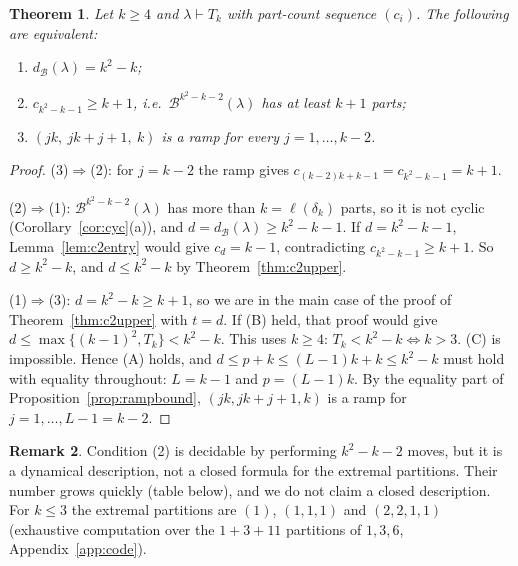 \documentclass[11pt]{article}
\newtheorem{theorem}{Theorem}[section]
\theoremstyle{definition}
\newtheorem{remark}[theorem]{Remark}
\newcommand{\B}{\mathcal{B}}
\newcommand{\dB}{d_{\mathcal{B}}}
\renewcommand{\le}{\leqslant}
\renewcommand{\ge}{\geqslant}
\begin{document}
\begin{theorem}\label{thm:c2ext}
Let $k\ge4$ and $\lambda\vdash T_k$ with part-count sequence $(c_i)$.  The following are equivalent:
\begin{enumerate}
\item[(1)] $\dB(\lambda)=k^2-k$;
\item[(2)] $c_{k^2-k-1}\ge k+1$, i.e.\ $\B^{k^2-k-2}(\lambda)$ has at least $k+1$ parts;
\item[(3)] $(jk,\ jk+j+1,\ k)$ is a ramp for every $j=1,\dots,k-2$.
\end{enumerate}
\end{theorem}
\begin{proof}
(3)$\Rightarrow$(2): for $j=k-2$ the ramp gives $c_{(k-2)k+k-1}=c_{k^2-k-1}=k+1$.

(2)$\Rightarrow$(1): $\B^{k^2-k-2}(\lambda)$ has more than $k=\ell(\delta_k)$ parts, so it is not cyclic
(Corollary~\ref{cor:cyc}(a)), and $d=\dB(\lambda)\ge k^2-k-1$.  If $d=k^2-k-1$, Lemma~\ref{lem:c2entry} would give
$c_{d}=k-1$, contradicting $c_{k^2-k-1}\ge k+1$.  So $d\ge k^2-k$, and $d\le k^2-k$ by
Theorem~\ref{thm:c2upper}.

(1)$\Rightarrow$(3): $d=k^2-k\ge k+1$, so we are in the main case of the proof of Theorem~\ref{thm:c2upper}
with $t=d$.  If (B) held, that proof would give $d\le\max\{(k-1)^2,T_k\}<k^2-k$.  This uses $k\ge4$:
$T_k<k^2-k\iff k>3$.  (C) is impossible.  Hence (A) holds, and $d\le p+k\le(L-1)k+k\le k^2-k$ must hold with
equality throughout: $L=k-1$ and $p=(L-1)k$.  By the equality part of Proposition~\ref{prop:rampbound},
$(jk,jk+j+1,k)$ is a ramp for $j=1,\dots,L-1=k-2$.
\end{proof}

\begin{remark}\label{rem:c2small}
Condition (2) is decidable by performing $k^2-k-2$ moves, but it is a dynamical description, not a closed
formula for the extremal partitions.  Their number grows quickly (table below), and we do not claim a
closed description.  For $k\le3$ the extremal partitions are $(1)$, $(1,1,1)$ and $(2,2,1,1)$ (exhaustive
computation over the $1+3+11$ partitions of $1,3,6$, Appendix~\ref{app:code}).
\end{remark}
\end{document}
